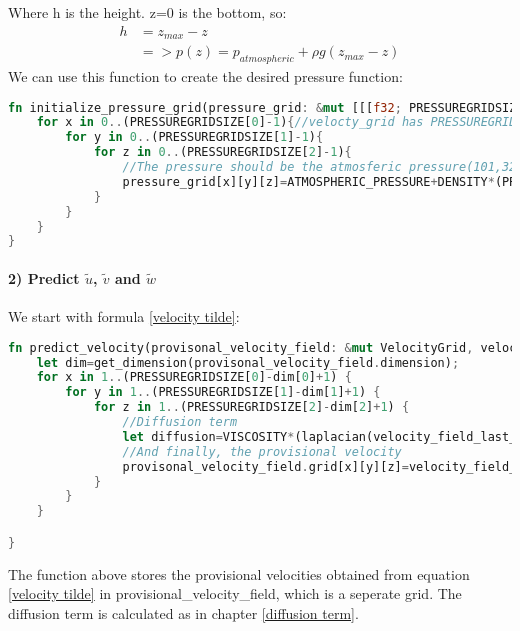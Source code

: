 \documentclass{article}
\begin{document}
Where h is the height. z=0 is the bottom, so:
\[
\begin{split}
  h&=z_{max}-z\\
  &=>p(z)=p_{atmospheric}+\rho g(z_{max}-z)
\end{split}
\]
We can use this function to create the desired pressure function:
\begin{lstlisting}[language=Rust, style=boxed, breaklines=true]
fn initialize_pressure_grid(pressure_grid: &mut [[[f32; PRESSUREGRIDSIZE[2]];PRESSUREGRIDSIZE[1]];PRESSUREGRIDSIZE[0]]){
    for x in 0..(PRESSUREGRIDSIZE[0]-1){//velocty_grid has PRESSUREGRIDSIZE[dimension] elements, so loop from 0 to PRESSUREGRIDSIZE[dimension]-1.
        for y in 0..(PRESSUREGRIDSIZE[1]-1){
            for z in 0..(PRESSUREGRIDSIZE[2]-1){
                //The pressure should be the atmosferic pressure(101,325Pa) plus the pressure that is exercised by the water above a point on the water at that point. 
                pressure_grid[x][y][z]=ATMOSPHERIC_PRESSURE+DENSITY*(PRESSUREGRIDSIZE[2] as f32 - z as f32)*GRIDELEMENTSCALE*EXTERNALFORCE[2];
            }
        }
    }
}
\end{lstlisting}



\paragraph{2) Predict \(\tilde{u}\), \(\tilde{v}\) and \(\tilde{w}\)}  We start with formula \ref{velocity tilde}:

\begin{lstlisting}[language=Rust, style=boxed, breaklines=true]
fn predict_velocity(provisonal_velocity_field: &mut VelocityGrid, velocity_field_last_time_step: &VelocityGrid, orthogonal_velocity_field_a: &VelocityGrid, orthogonal_velocity_field_b: &VelocityGrid, pressure_grid: [[[f32; PRESSUREGRIDSIZE[2]]; PRESSUREGRIDSIZE[1]]; PRESSUREGRIDSIZE[0]]){
    let dim=get_dimension(provisonal_velocity_field.dimension);
    for x in 1..(PRESSUREGRIDSIZE[0]-dim[0]+1) {
        for y in 1..(PRESSUREGRIDSIZE[1]-dim[1]+1) {
            for z in 1..(PRESSUREGRIDSIZE[2]-dim[2]+1) {
                //Diffusion term
                let diffusion=VISCOSITY*(laplacian(velocity_field_last_time_step, x, y, z));
                //And finally, the provisional velocity
                provisonal_velocity_field.grid[x][y][z]=velocity_field_last_time_step.grid[x][y][z]+TIMESTEPSIZE/DENSITY*(-convection_term(velocity_field_last_time_step, orthogonal_velocity_field_a, orthogonal_velocity_field_b, x, y, z)-first_order_central_spatial_pressure_derivative(pressure_grid, x-1, y-1, z-1, velocity_field_last_time_step.dimension)+diffusion+DENSITY*EXTERNALFORCE[velocity_field_last_time_step.dimension]);
            }
        }
    }

}
\end{lstlisting}
The function above stores the provisional velocities obtained from equation \ref{velocity tilde} in provisional\_velocity\_field, which is a seperate grid. The diffusion term is calculated as in chapter \ref{diffusion term}.
\end{document}
